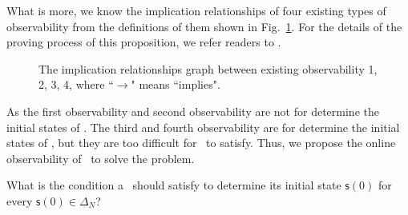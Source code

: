 What is more, we know the implication relationships of four existing types of observability from the definitions of them shown in Fig.~\ref{fig:9}. For the details of the proving process of this proposition, we refer readers to \cite{Zhang2016Observability}.

 \begin{figure}[thpb]
      \centering
      
      \caption{The implication relationships graph between existing observability 1, 2, 3, 4, where ``$\rightarrow$" means ``implies".}
      \label{fig:9}
   \end{figure}

   

 

As the first observability and second observability are not for determine the initial states of \BCNs.  The third and fourth observability are for determine the initial states of \BCNs, but they are too difficult for \BCNs\ to satisfy. Thus, we propose the online observability of \BCNs\ to solve the problem.

 \begin{problem}
\label{pro:2}
What is the condition a \BCN\ should satisfy to determine its initial state $\mathsf{s}(0)$ for every $\mathsf{s}(0)\in\Delta_N$?
\end{problem}